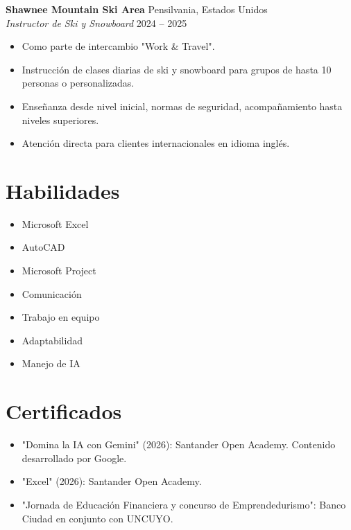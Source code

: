 \documentclass[11pt,a4paper,sans]{article}
\begin{document}
\vspace{5pt}

\textbf{Shawnee Mountain Ski Area} \hfill Pensilvania, Estados Unidos %
\\ \textit{Instructor de Ski y Snowboard} \hfill 2024 -- 2025 %
\begin{itemize}
    \item Como parte de intercambio "Work \& Travel". %
    \item Instrucción de clases diarias de ski y snowboard para grupos de hasta 10 personas o personalizadas. %
    \item Enseñanza desde nivel inicial, normas de seguridad, acompañamiento hasta niveles superiores. %
    \item Atención directa para clientes internacionales en idioma inglés. %
\end{itemize}

\section{Habilidades}
\begin{itemize}
    \item Microsoft Excel %
    \item AutoCAD %
    \item Microsoft Project %
    \item Comunicación %
    \item Trabajo en equipo %
    \item Adaptabilidad %
    \item Manejo de IA %
\end{itemize}

\section{Certificados}
\begin{itemize}
    \item "Domina la IA con Gemini" (2026): Santander Open Academy. Contenido desarrollado por Google. %
    \item "Excel" (2026): Santander Open Academy. %
    \item "Jornada de Educación Financiera y concurso de Emprendedurismo": Banco Ciudad en conjunto con UNCUYO. %
\end{itemize}
\end{document}
